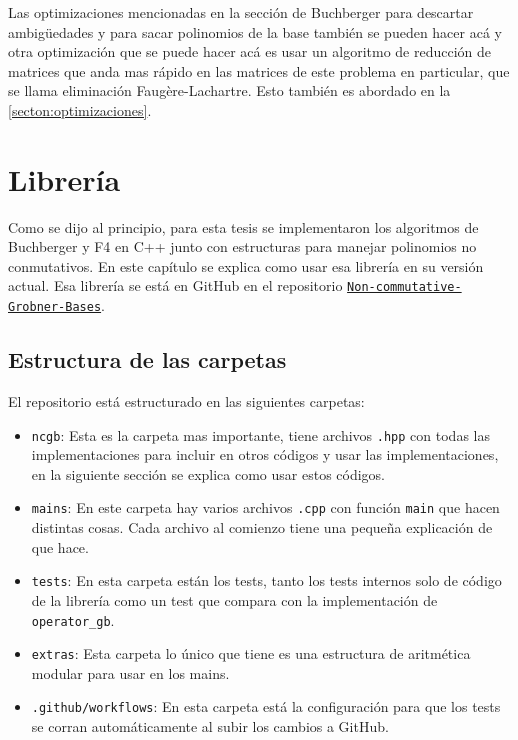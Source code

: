 \documentclass{report}
\theoremstyle{customstyle}
\theoremstyle{factstyle}
\begin{document}
Las optimizaciones mencionadas en la sección de Buchberger para descartar ambigüedades y para sacar polinomios de la base también se pueden hacer acá y otra optimización que se puede hacer acá es usar un algoritmo de reducción de matrices que anda mas rápido en las matrices de este problema en particular, que se llama eliminación Faugère-Lachartre. Esto también es abordado en la \cref{secton:optimizaciones}.

\chapter{Librería}

Como se dijo al principio, para esta tesis se implementaron los algoritmos de Buchberger y F4 en C++ junto con estructuras para manejar polinomios no conmutativos. En este capítulo se explica como usar esa librería en su versión actual. %
Esa librería se está en GitHub en el repositorio \href{https://github.com/IvanRenison/Non-commutative-Grobner-Bases}{\texttt{Non-commutative-Grobner-Bases}}. %

\section{Estructura de las carpetas}

El repositorio está estructurado en las siguientes carpetas:

\begin{itemize}
  \item \texttt{ncgb}: Esta es la carpeta mas importante, tiene archivos \texttt{.hpp} con todas las implementaciones para incluir en otros códigos y usar las implementaciones, en la siguiente sección se explica como usar estos códigos.
  \item \texttt{mains}: En este carpeta hay varios archivos \texttt{.cpp} con función \texttt{main} que hacen distintas cosas. Cada archivo al comienzo tiene una pequeña explicación de que hace.
  \item \texttt{tests}: En esta carpeta están los tests, tanto los tests internos solo de código de la librería como un test que compara con la implementación de \texttt{operator\_gb}. %
  \item \texttt{extras}: Esta carpeta lo único que tiene es una estructura de aritmética modular para usar en los mains.
  \item \texttt{.github/workflows}: En esta carpeta está la configuración para que los tests se corran automáticamente al subir los cambios a GitHub.
\end{itemize}
\end{document}
